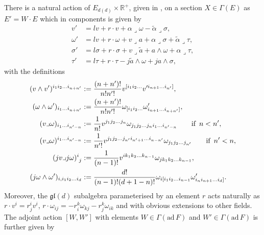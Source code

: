There is a natural action of $E_{d(d)}\times\mathbb{R}^+$, given in \cite{Ashmore:2015joa}, on a section $X\in\Gamma(E)$ as $E' = W\cdot E$ which in components is given by 
\begin{equation}
    \begin{aligned}
        v'&= lv+r\cdot v+\alpha\lrcorner\omega-\tilde{\alpha}\lrcorner\sigma,\\
        \omega'&=lv+r\cdot \omega+v\lrcorner a+\alpha\lrcorner\sigma+\tilde{\alpha}\lrcorner\tau,\\
        \sigma'&= l\sigma+r\cdot \sigma+v\lrcorner\tilde{a}+a\wedge\omega+\alpha\lrcorner\tau,\\
        \tau'&= l\tau+r\cdot\tau-j\tilde{a}\wedge\omega+ja\wedge\sigma,
    \end{aligned}
\end{equation}
with the definitions 
\begin{equation}
    \begin{aligned}
        (v\wedge v')^{i_1i_2\ldots i_{n+n'}} &:= \frac{(n+n')!}{n!n'!}v^{[i_1i_2\ldots}v'^{i_{n+1}\ldots i_{n'}]},\\
        (\omega\wedge\omega')_{i_1\ldots i_{n+n'}} &:= \frac{(n+n')!}{n!n'!}\omega_{[i_1i_2\ldots}\omega'_{i_{n+1}\ldots i_{n+n'}]},\\
        (v\lrcorner\omega)_{i_1\ldots i_{n'-n}} &:= \frac{1}{n!}v^{j_1j_2\ldots j_n}\omega_{j_1j_2\ldots j_ni_{1}\ldots i_{n'-n}} \qquad \text{if }\, n<n',\\
        (v\lrcorner\omega)^{i_1\ldots i_{n'-n}} &:= \frac{1}{n'!}v^{j_1j_2\ldots j_{n'}i_{n'+1}\ldots i_{n-n'}}\omega_{j_1j_2\ldots j_{n'}} \qquad \text{if }\, n'<n,\\
        (jv\lrcorner j\omega)\tensor{}{^i_j}&:= \frac{1}{(n-1)!}v^{ik_1k_2\ldots k_{n-1}}\omega_{jk_1k_2\ldots k_{n-1}},\\
        (j\omega\wedge\omega')_{i,i_1i_2\ldots i_{d}} &:= \frac{d!}{(n-1)!(d+1-n)!}\omega_{i[i_1i_2\ldots i_{n-1}}\omega'_{i_ni_{n+1}\ldots i_d]}.
    \end{aligned}
\end{equation}
Moreover, the $\mathfrak{gl}(d)$ subalgebra parameterised by an element $r$ acts naturally as $r\cdot v^i=r^i_jv^i$, $r\cdot\omega_{ij}=-r^k_i\omega_{kj}-r^k_j\omega_{ik}$ and with obvious extensions to other fields. The adjoint action $[W,W']$ with elements  $W\in\Gamma(\text{ad}\,F)$ and $W'\in\Gamma(\text{ad}\,F)$ is further given by 
